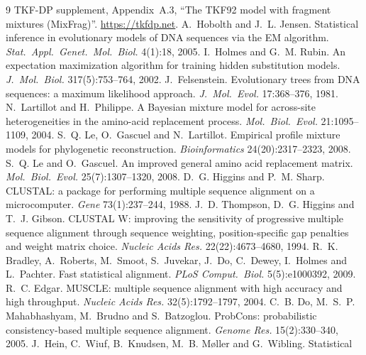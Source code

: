 \documentclass[11pt]{article}
\begin{document}
\begin{thebibliography}{9}
TKF-DP supplement, Appendix~A.3, ``The TKF92 model with fragment mixtures
(MixFrag)''. \url{https://tkfdp.net}.
A.~Hobolth and J.~L. Jensen. Statistical inference in evolutionary models of
DNA sequences via the EM algorithm. \emph{Stat.\ Appl.\ Genet.\ Mol.\ Biol.}
4(1):18, 2005.
I.~Holmes and G.~M. Rubin. An expectation maximization algorithm for training
hidden substitution models. \emph{J.\ Mol.\ Biol.} 317(5):753--764, 2002.
J.~Felsenstein. Evolutionary trees from {DNA} sequences: a maximum likelihood
approach. \emph{J.\ Mol.\ Evol.} 17:368--376, 1981.
N.~Lartillot and H.~Philippe. A Bayesian mixture model for across-site
heterogeneities in the amino-acid replacement process. \emph{Mol.\ Biol.\
Evol.} 21:1095--1109, 2004.
S.~Q. Le, O.~Gascuel and N.~Lartillot. Empirical profile mixture models for
phylogenetic reconstruction. \emph{Bioinformatics} 24(20):2317--2323, 2008.
\bibitem[Le and Gascuel(2008)]{LeGascuel2008}
S.~Q. Le and O.~Gascuel. An improved general amino acid replacement matrix.
\emph{Mol.\ Biol.\ Evol.} 25(7):1307--1320, 2008.
D.~G. Higgins and P.~M. Sharp. CLUSTAL: a package for performing multiple
sequence alignment on a microcomputer. \emph{Gene} 73(1):237--244, 1988.
\bibitem[Thompson et~al.(1994)]{Thompson1994}
J.~D. Thompson, D.~G. Higgins and T.~J. Gibson. CLUSTAL W: improving the
sensitivity of progressive multiple sequence alignment through sequence
weighting, position-specific gap penalties and weight matrix choice.
\emph{Nucleic Acids Res.} 22(22):4673--4680, 1994.
R.~K. Bradley, A.~Roberts, M.~Smoot, S.~Juvekar, J.~Do, C.~Dewey, I.~Holmes
and L.~Pachter. Fast statistical alignment. \emph{PLoS Comput.\ Biol.}
5(5):e1000392, 2009.
R.~C. Edgar. MUSCLE: multiple sequence alignment with high accuracy and high
throughput. \emph{Nucleic Acids Res.} 32(5):1792--1797, 2004.
C.~B. Do, M.~S.~P. Mahabhashyam, M.~Brudno and S.~Batzoglou. ProbCons:
probabilistic consistency-based multiple sequence alignment. \emph{Genome
Res.} 15(2):330--340, 2005.
J.~Hein, C.~Wiuf, B.~Knudsen, M.~B. M{\o}ller and G.~Wibling. Statistical

\end{thebibliography}
\end{document}
